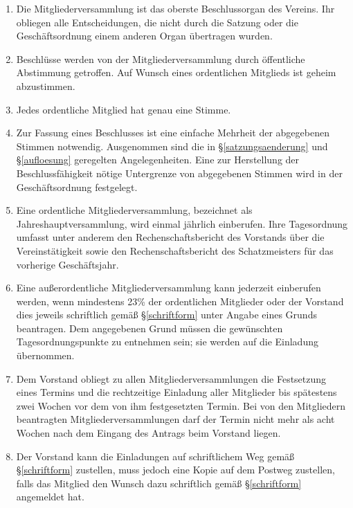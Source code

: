 \documentclass[fontsize=12pt,paper=a4,pagesize]{scrartcl}
\begin{document}
\begin{enumerate}
	\item Die Mitgliederversammlung ist das oberste Beschlussorgan des
		Vereins. Ihr obliegen alle Entscheidungen, die nicht durch die
		Satzung oder die Geschäftsordnung einem anderen Organ übertragen
		wurden.

	\item Beschlüsse werden von der Mitgliederversammlung durch öffentliche
		Abstimmung getroffen. Auf Wunsch eines ordentlichen Mitglieds ist geheim
		abzustimmen.

	\item Jedes ordentliche Mitglied hat genau eine Stimme.

	\item Zur Fassung eines Beschlusses ist eine einfache Mehrheit der
		abgegebenen Stimmen notwendig. Ausgenommen sind die in
		§\ref{satzungsaenderung} und §\ref{aufloesung} geregelten
		Angelegenheiten. Eine zur Herstellung der
		Beschlussfähigkeit nötige Untergrenze von abgegebenen
		Stimmen wird in der Geschäftsordnung festgelegt.

	\item Eine ordentliche Mitgliederversammlung, bezeichnet als
		Jahreshauptversammlung, wird einmal jährlich einberufen. Ihre
		Tagesordnung umfasst unter anderem den Rechenschaftsbericht des
		Vorstands über die Vereinstätigkeit sowie den Rechenschaftsbericht des
		Schatzmeisters für das vorherige Geschäftsjahr.

	\item Eine außerordentliche Mitgliederversammlung kann jederzeit
		einberufen werden, wenn mindestens 23\% der ordentlichen Mitglieder
		oder der Vorstand dies jeweils schriftlich gemäß §\ref{schriftform} unter Angabe
		eines Grunds beantragen. Dem angegebenen Grund müssen die gewünschten
		Tagesordnungspunkte zu entnehmen sein; sie werden auf die Einladung
		übernommen.

	\item Dem Vorstand obliegt zu allen Mitgliederversammlungen die
		Festsetzung eines Termins und die rechtzeitige Einladung aller
		Mitglieder bis spätestens zwei Wochen vor dem von ihm festgesetzten
		Termin. Bei von den Mitgliedern beantragten Mitgliederversammlungen
		darf der Termin nicht mehr als acht Wochen nach dem Eingang des Antrags
		beim Vorstand liegen.

	\item Der Vorstand kann die Einladungen auf schriftlichem Weg gemäß §\ref{schriftform}
		zustellen, muss jedoch eine Kopie auf dem Postweg zustellen, falls
		das Mitglied den Wunsch dazu schriftlich gemäß §\ref{schriftform} angemeldet hat.


\end{enumerate}
\end{document}
